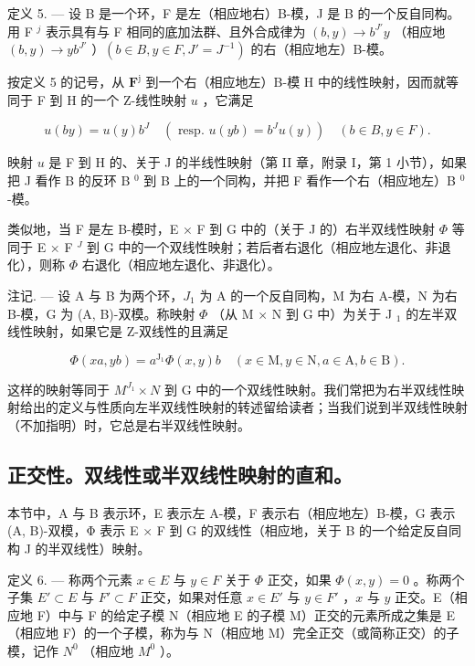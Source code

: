 定义 5. --- 设 B 是一个环，F 是左（相应地右）B-模，J 是 B 的一个反自同构。用 F \(^{j}\) 表示具有与 F 相同的底加法群、且外合成律为 \((b, y) \to b^{J'}y\) （相应地 \((b, y) \to yb^{J'}\) ）\((b \in B, y \in F, J' = J^{-1})\) 的右（相应地左）B-模。

按定义 5 的记号，从 \(\mathbf{F}^{\mathrm{j}}\) 到一个右（相应地左）B-模 H 中的线性映射，因而就等同于 F 到 H 的一个 Z-线性映射 \(u\) ，它满足

\[
u (b y) = u (y) b ^ {J} \quad (\text { resp. } u (y b) = b ^ {J} u (y)) \quad (b \in B, y \in F).
\]

映射 \(u\) 是 F 到 H 的、关于 J 的半线性映射（第 II 章，附录 I，第 1 小节），如果把 J 看作 B 的反环 B \(^{0}\) 到 B 上的一个同构，并把 F 看作一个右（相应地左）B \(^{0}\) -模。

类似地，当 F 是左 B-模时，E × F 到 G 中的（关于 J 的）右半双线性映射 \(\Phi\) 等同于 E × F \(^{J}\) 到 G 中的一个双线性映射；若后者右退化（相应地左退化、非退化），则称 \(\Phi\) 右退化（相应地左退化、非退化）。

注记. --- 设 A 与 B 为两个环，\(J_{1}\) 为 A 的一个反自同构，M 为右 A-模，N 为右 B-模，G 为 (A, B)-双模。称映射 \(\Phi\) （从 M \(\times\) N 到 G 中）为关于 J \(_{1}\) 的左半双线性映射，如果它是 Z-双线性的且满足

\[
\Phi (x a, y b) = a ^ {\mathrm{J} _ {1}} \Phi (x, y) b \quad (x \in \mathrm{M}, y \in \mathrm{N}, a \in \mathrm{A}, b \in \mathrm{B}).\tag{9}
\]

这样的映射等同于 \(M^{J_{1}} \times N\) 到 G 中的一个双线性映射。我们常把为右半双线性映射给出的定义与性质向左半双线性映射的转述留给读者；当我们说到半双线性映射（不加指明）时，它总是右半双线性映射。

\subsection{正交性。双线性或半双线性映射的直和。}

本节中，A 与 B 表示环，E 表示左 A-模，F 表示右（相应地左）B-模，G 表示 (A, B)-双模，Φ 表示 E × F 到 G 的双线性（相应地，关于 B 的一个给定反自同构 J 的半双线性）映射。

定义 6. --- 称两个元素 \(x \in E\) 与 \(y \in F\) 关于 \(\Phi\) 正交，如果 \(\Phi(x, y) = 0\) 。称两个子集 \(E' \subset E\) 与 \(F' \subset F\) 正交，如果对任意 \(x \in E'\) 与 \(y \in F'\) ，\(x\) 与 \(y\) 正交。E（相应地 F）中与 F 的给定子模 N（相应地 E 的子模 M）正交的元素所成之集是 E（相应地 F）的一个子模，称为与 N（相应地 M）完全正交（或简称正交）的子模，记作 \(N^0\) （相应地 \(M^0\) ）。

